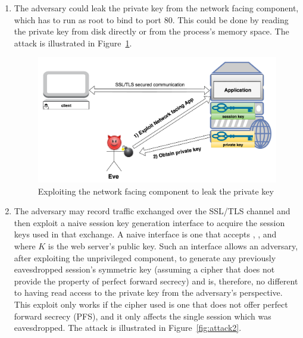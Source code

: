 \documentclass[../main.tex]{subfiles}
\begin{document}
\begin{enumerate}
  \item The adversary could leak the private key from the network facing
    component, which has to run as root to bind to port 80.  This could
    be done by reading the private key from disk directly or from the
    process's memory space. The attack is illustrated in
    Figure~\ref{fig:attack1}.

	\begin{figure}[H]
          \centering
          \includegraphics[scale=0.15]{images/attack1.png}
          \caption{Exploiting the network facing component to leak the
            private key}
          \label{fig:attack1}
	\end{figure}

  \item The adversary may record traffic exchanged over the
    SSL/TLS channel and then exploit a naive session key
    generation interface to acquire the session keys used in that
    exchange. A naive interface is one that accepts \crandom,
    \srandom, and \premaster~ where $K$ is the web server's public
    key.  Such an interface allows an adversary, after exploiting
    the unprivileged component, to generate any previously
    eavesdropped session's symmetric key (assuming a cipher that
    does not provide the property of perfect forward secrecy) and
    is, therefore, no different to having read access to the
    private key from the adversary's perspective. This exploit
    only works if the cipher used is one that does not offer
    perfect forward secrecy (PFS), and it only affects the single
    session which was eavesdropped. The attack is illustrated in
    Figure~\ref{fig:attack2}.


\end{enumerate}
\end{document}
